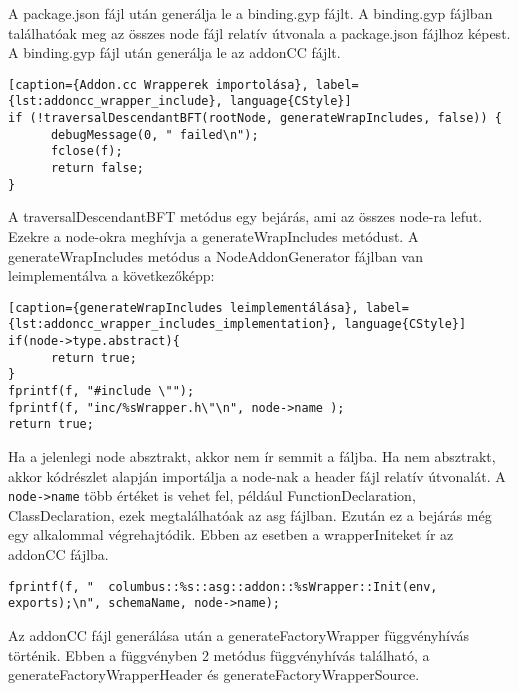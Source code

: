 \noindent

A package.json fájl után generálja le a binding.gyp fájlt.
A binding.gyp fájlban találhatóak meg az összes node fájl relatív útvonala a package.json fájlhoz képest.
A binding.gyp fájl után generálja le az addonCC fájlt.

\begin{lstlisting}[caption={Addon.cc Wrapperek importolása}, label={lst:addoncc_wrapper_include}, language{CStyle}]
if (!traversalDescendantBFT(rootNode, generateWrapIncludes, false)) {
      debugMessage(0, " failed\n");
      fclose(f);
      return false;
}
\end{lstlisting}

A traversalDescendantBFT metódus egy bejárás, ami az összes node-ra lefut. Ezekre a node-okra meghívja a generateWrapIncludes metódust.
A generateWrapIncludes metódus a NodeAddonGenerator fájlban van leimplementálva a következőképp:

\begin{lstlisting}[caption={generateWrapIncludes leimplementálása}, label={lst:addoncc_wrapper_includes_implementation}, language{CStyle}]
if(node->type.abstract){
      return true;
}
fprintf(f, "#include \"");
fprintf(f, "inc/%sWrapper.h\"\n", node->name );
return true;
\end{lstlisting}

Ha a jelenlegi node absztrakt, akkor nem ír semmit a fáljba.
Ha nem absztrakt, akkor  kódrészlet alapján importálja a node-nak a header fájl relatív útvonalát.
A \texttt{node->name} több értéket is vehet fel, például FunctionDeclaration, ClassDeclaration, ezek megtalálhatóak az asg fájlban.
Ezután ez a bejárás még egy alkalommal végrehajtódik. Ebben az esetben a wrapperIniteket ír az addonCC fájlba.

\begin{lstlisting}[caption={generateWrapInit leimplementálása}, label={lst:addoncc_wrapper_inits_implementation}, language={CStyle}]
fprintf(f, "  columbus::%s::asg::addon::%sWrapper::Init(env, exports);\n", schemaName, node->name);
\end{lstlisting}

\noindent

Az addonCC fájl generálása után a generateFactoryWrapper függvényhívás történik.
Ebben a függvényben 2 metódus függvényhívás található, a generateFactoryWrapperHeader és generateFactoryWrapperSource.

\noindent

